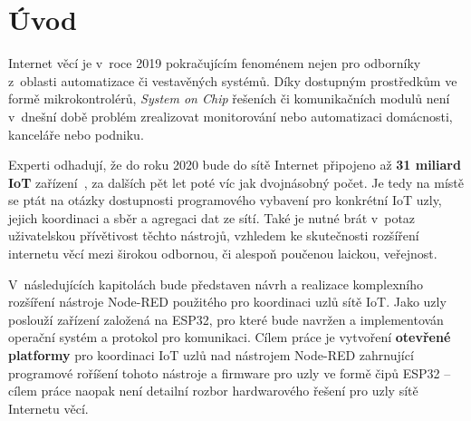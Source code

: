 \chapter{Úvod}
\label{ch:uvod}

Internet věcí je v~roce 2019 pokračujícím fenoménem nejen pro odborníky z~oblasti automatizace či vestavěných systémů.
Díky dostupným prostředkům ve formě mikrokontrolérů, \textit{System on Chip} řešeních či komunikačních modulů není
v~dnešní době problém zrealizovat monitorování nebo automatizaci domácnosti, kanceláře nebo podniku.

Experti odhadují, že do roku 2020 bude do sítě Internet připojeno až \textbf{31 miliard IoT}
zařízení~\cite{StatistaIoT, IoTTrends}, za dalších pět let poté víc jak dvojnásobný počet.
Je tedy na místě se ptát na otázky dostupnosti programového vybavení pro konkrétní IoT uzly, jejich koordinaci a sběr
a agregaci dat ze sítí.
Také je nutné brát v~potaz uživatelskou přívětivost těchto nástrojů, vzhledem ke
skutečnosti rozšíření internetu věcí mezi širokou odbornou, či alespoň poučenou laickou, veřejnost.

V~následujících kapitolách bude představen návrh a realizace komplexního rozšíření nástroje Node-RED použitého pro
koordinaci uzlů sítě IoT. Jako uzly poslouží zařízení založená na ESP32, pro které bude navržen a implementován
operační systém a protokol pro komunikaci.
Cílem práce je vytvoření \textbf{otevřené platformy} pro koordinaci IoT uzlů nad nástrojem Node-RED zahrnující
programové roříšení tohoto nástroje a firmware pro uzly ve formě čipů ESP32 -- cílem práce naopak není
detailní rozbor hardwarového řešení pro uzly sítě Internetu věcí.

